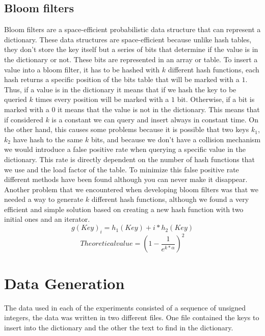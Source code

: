 \documentclass{article}
\begin{document}
    \subsection{Bloom filters}
     Bloom filters \cite{ARTICLE:4} are a space-efficient probabilistic data structure that can represent a dictionary. These data structures are space-efficient because 
    unlike hash tables, they don't store the key itself but a series of bits that determine if the value is in the dictionary or not. These bits are represented in an array or table. To insert a value into a bloom filter, it has to be hashed with $k$ different hash functions, each hash returns a specific position of the bits table that will be marked with a $1$. Thus, if a value is in the dictionary it means that if we hash the key to be queried $k$ times every position will be marked with a $1$ bit. Otherwise, if a bit is marked with a $0$ it means that the value is not in the dictionary. This means that if considered $k$ is a constant we can query and insert always in constant time. 
    On the other hand, this causes some problems because it is possible that two keys $k_1$, $k_2$ have hash to the same $k$ bits, and because we don't have a collision mechanism we would introduce a false positive rate when querying a specific value in the dictionary. This rate is directly dependent on the number of hash functions that we use and the load factor of the table. 
    To minimize \cite{ARTICLE:1} this false positive rate different methods have been found although you can never make it disappear. Another problem that we encountered when developing bloom filters was that we needed a way to generate $k$ different hash functions, although we found a very efficient and simple solution \cite{ARTICLE:3} based on creating a new hash function with two initial ones and an iterator. 
    \begin{equation}
    g(Key)_i = h_1(Key) + i * h_2(Key)
    \end{equation}
    \begin{equation}
    Theoretical value = (1 - \frac{1}{e^{k * \alpha}})^2
    \end{equation}
    
    
    
    \section{Data Generation}
        The data used in each of the experiments consisted of a sequence of unsigned integers,  
        the data was written in two different files. One file contained the keys to insert into the dictionary and the other the text to find in the dictionary. 
       
\end{document}
